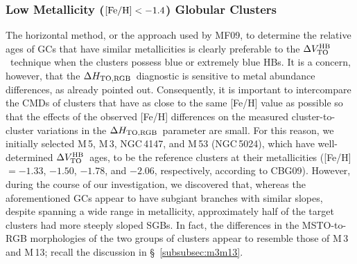 \documentclass[12pt,preprint]{aastex}
\newcommand\delv{\Delta V^{\rm HB}_{\rm TO}}
\newcommand\delc{\Delta H_{\rm TO,RGB}}
\begin{document}
\subsubsection{Low Metallicity (${\rm [Fe/H]} < -1.4$) Globular Clusters}
\label{subsubsec:blue}

The horizontal method, or the approach used by MF09, to determine the relative
ages of GCs that have similar metallicities is clearly preferable to the 
$\delv$\ technique when the clusters possess blue or extremely blue HBs.  It is
a concern, however, that the $\delc$\ diagnostic is sensitive to metal abundance
differences, as already pointed out.   Consequently, it is important to 
intercompare the CMDs of clusters that have as close to the same [Fe/H] value
as possible so that the effects of the observed [Fe/H] differences on the
measured cluster-to-cluster variations in the $\delc$\ parameter are small.
For this reason, we initially selected M$\,$5, M$\,$3, NGC$\,$4147, and M$\,$53
(NGC$\,$5024), which have well-determined $\delv$\ ages, to be the reference
clusters at their metallicities ([Fe/H] $= -1.33$, $-1.50$, $-1.78$, and
$-2.06$, respectively, according to CBG09).  However, during the course of our
investigation, we discovered that, whereas the aforementioned GCs appear to
have subgiant branches with similar slopes, despite spanning a wide range in
metallicity, approximately half of the target clusters had more steeply sloped
SGBs.  In fact, the differences in the MSTO-to-RGB morphologies of the two
groups of clusters appear to resemble those of M$\,$3 and M$\,$13; recall the
discussion in \S~\ref{subsubsec:m3m13}.
\end{document}
